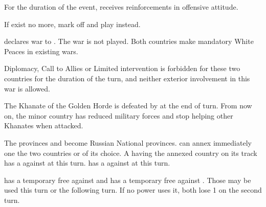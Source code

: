\phadm
\aparag For the duration of the event, \paysecosse receives reinforcements in
offensive attitude.





\condition{}
\aparag If \paysCrimee exist no more, mark off and play \RD instead.

\phevnt
\aparag \paysCrimee declares war to \paysSteppes. The war is not played.
\aparag Both countries make mandatory White Peaces in existing wars.

\phdipl
\aparag Diplomacy, Call to Allies or Limited intervention is forbidden for
these two countries for the duration of the turn, and neither exterior
involvement in this war is allowed.

\phpaix
\aparag The Khanate of the Golden Horde is defeated by \paysCrimee at the end
of turn. From now on, the minor country \paysSteppes has reduced military
forces and stop helping other Khanates when attacked.





\phevnt
\aparag The provinces \provincePskov and \provinceRyazan become Russian
National provinces.
\aparag \RUS can annex immediately one the two countries \paysPskov or
\paysRyazan of its choice.
\aparag A \MAJ having the annexed country on its track has a \CB against \RUS
at this turn.
\aparag \POL has a \CB against \RUS at this turn.






\phevnt
\aparag \RUS has a temporary free \CB against \POL and \POL has a temporary
free \CB against \RUS. Those \CB may be used this turn or the following
turn. If no power uses it, both lose 1 \STAB on the second turn.





